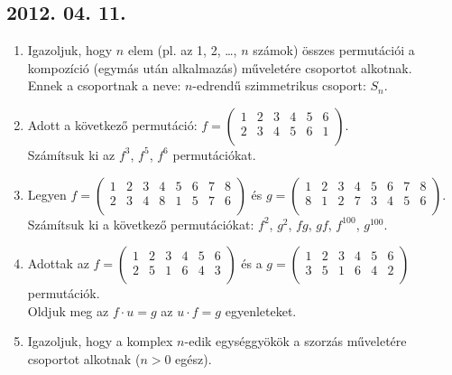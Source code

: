 \documentclass{article}
\begin{document}
\subsection*{2012. 04. 11.}
\begin{enumerate}
\item Igazoljuk, hogy $n$ elem (pl. az 1, 2, \ldots, $n$ számok) összes permutációi a kompozíció (egymás után alkalmazás) műveletére csoportot alkotnak.\\ Ennek a csoportnak a neve: $n$-edrendű szimmetrikus csoport: $S_n$.
\item Adott a következő permutáció: $f=\left(\begin{matrix}
1&2&3&4&5&6\\
2&3&4&5&6&1\\
\end{matrix}\right)$.\\
Számítsuk ki az $f^3$, $f^5$, $f^6$ permutációkat.
\item Legyen $f=\left(\begin{matrix}
1&2&3&4&5&6&7&8\\
2&3&4&8&1&5&7&6\\
\end{matrix}\right)$ és $g=\left(\begin{matrix}
1&2&3&4&5&6&7&8\\
8&1&2&7&3&4&5&6\\
\end{matrix}\right)$.\\ Számítsuk ki a következő permutációkat: $f^2$, $g^2$, $fg$, $gf$, $f^{100}$, $g^{100}$.
\item Adottak az $f=\left(\begin{matrix}
1&2&3&4&5&6\\
2&5&1&6&4&3\\
\end{matrix}\right)$ és a $g=\left(\begin{matrix}
1&2&3&4&5&6\\
3&5&1&6&4&2\\
\end{matrix}\right)$ permutációk.\\ Oldjuk meg az $f\cdot u=g$ az $u\cdot f=g$ egyenleteket.
\item Igazoljuk, hogy a komplex $n$-edik egységgyökök a szorzás műveletére csoportot alkotnak ($n>0$ egész).
\end{enumerate}
\end{document}
